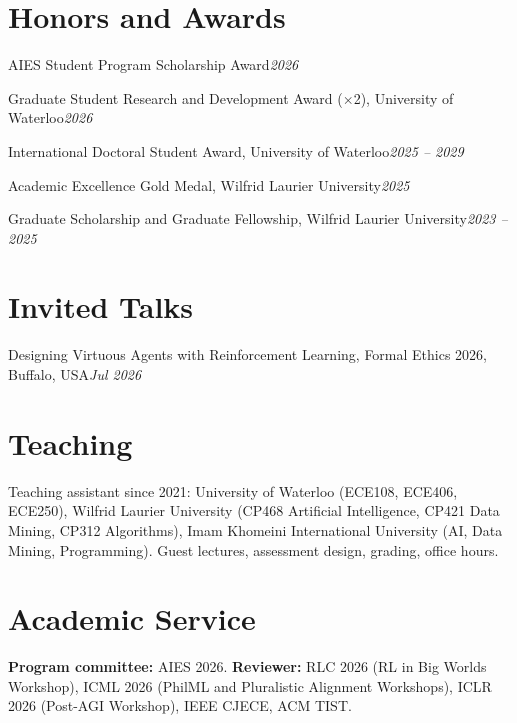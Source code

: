 \documentclass[letterpaper,11pt]{article}
\newcommand{\sub}[2]{#1\hfill\textit{#2}\par}
\begin{document}
\section{Honors and Awards}
\sub{AIES Student Program Scholarship Award}{2026}
\sub{Graduate Student Research and Development Award ($\times$2), University of Waterloo}{2026}
\sub{International Doctoral Student Award, University of Waterloo}{2025 -- 2029}
\sub{Academic Excellence Gold Medal, Wilfrid Laurier University}{2025}
\sub{Graduate Scholarship and Graduate Fellowship, Wilfrid Laurier University}{2023 -- 2025}

\section{Invited Talks}
\sub{Designing Virtuous Agents with Reinforcement Learning, Formal Ethics 2026, Buffalo, USA}{Jul 2026}

\section{Teaching}
Teaching assistant since 2021: University of Waterloo (ECE108, ECE406, ECE250), Wilfrid Laurier University (CP468 Artificial Intelligence, CP421 Data Mining, CP312 Algorithms), Imam Khomeini International University (AI, Data Mining, Programming). Guest lectures, assessment design, grading, office hours.

\section{Academic Service}
\textbf{Program committee:} AIES 2026. \textbf{Reviewer:} RLC 2026 (RL in Big Worlds Workshop), ICML 2026 (PhilML and Pluralistic Alignment Workshops), ICLR 2026 (Post-AGI Workshop), IEEE CJECE, ACM TIST.
\end{document}
